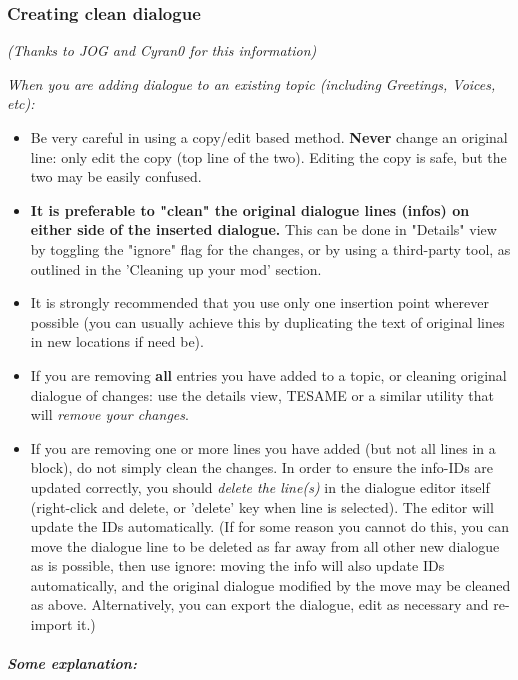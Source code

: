 \hypertarget{creating-clean-dialogue}{%
\subsubsection{Creating clean dialogue}\label{creating-clean-dialogue}}

\emph{(Thanks to JOG and Cyran0 for this information)}

\emph{When you are adding dialogue to an existing topic (including
Greetings, Voices, etc):}

\begin{itemize}
\item
  Be very careful in using a copy/edit based method. \textbf{Never}
  change an original line: only edit the copy (top line of the two).
  Editing the copy is safe, but the two may be easily confused.
\item
  \textbf{It is preferable to "clean" the original dialogue lines
  (infos) on either side of the inserted dialogue.} This can be done in
  "Details" view by toggling the "ignore" flag for the changes, or by
  using a third-party tool, as outlined in the 'Cleaning up your mod'
  section.
\item
  It is strongly recommended that you use only one insertion point
  wherever possible (you can usually achieve this by duplicating the
  text of original lines in new locations if need be).
\item
  If you are removing \textbf{all} entries you have added to a topic, or
  cleaning original dialogue of changes: use the details view, TESAME or
  a similar utility that will \emph{remove your changes}.
\item
  If you are removing one or more lines you have added (but not all
  lines in a block), do not simply clean the changes. In order to ensure
  the info-IDs are updated correctly, you should \emph{delete the
  line(s)} in the dialogue editor itself (right-click and delete, or
  'delete' key when line is selected). The editor will update the IDs
  automatically. (If for some reason you cannot do this, you can move
  the dialogue line to be deleted as far away from all other new
  dialogue as is possible, then use ignore: moving the info will also
  update IDs automatically, and the original dialogue modified by the
  move may be cleaned as above. Alternatively, you can export the
  dialogue, edit as necessary and re-import it.)
\end{itemize}

\hypertarget{some-explanation}{%
\subparagraph{Some explanation:}\label{some-explanation}}


